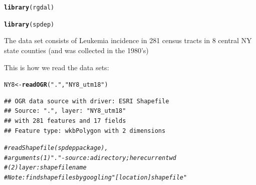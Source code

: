 \documentclass{article}\usepackage[]{graphicx}\usepackage[]{color}
\makeatletter
\newcommand{\hlstr}[1]{\textcolor[rgb]{0.192,0.494,0.8}{#1}}%
\newcommand{\hlcom}[1]{\textcolor[rgb]{0.678,0.584,0.686}{\textit{#1}}}%
\newcommand{\hlstd}[1]{\textcolor[rgb]{0.345,0.345,0.345}{#1}}%
\newcommand{\hlkwb}[1]{\textcolor[rgb]{0.69,0.353,0.396}{#1}}%
\newcommand{\hlkwd}[1]{\textcolor[rgb]{0.737,0.353,0.396}{\textbf{#1}}}%
\newenvironment{kframe}{%
 \def\at@end@of@kframe{}%
 \ifinner\ifhmode%
  \def\at@end@of@kframe{\end{minipage}}%
  \begin{minipage}{\columnwidth}%
 \fi\fi%
 \def\FrameCommand##1{\hskip\@totalleftmargin \hskip-\fboxsep
 \colorbox{shadecolor}{##1}\hskip-\fboxsep
     \hskip-\linewidth \hskip-\@totalleftmargin \hskip\columnwidth}%
 \MakeFramed {\advance\hsize-\width
   \@totalleftmargin\z@ \linewidth\hsize
   \@setminipage}}%
 {\par\unskip\endMakeFramed%
 \at@end@of@kframe}
\newenvironment{knitrout}{}{} %
\makeatother
\begin{document}
\begin{knitrout}
\color{fgcolor}\begin{kframe}
\begin{alltt}
\hlkwd{library}\hlstd{(rgdal)}
\end{alltt}


{\ttfamily\noindent\itshape\color{messagecolor}{\#\# Loading required package: sp\\\#\# rgdal: version: 0.8-16, (SVN revision 498)\\\#\# Geospatial Data Abstraction Library extensions to R successfully loaded\\\#\# Loaded GDAL runtime: GDAL 1.11.0, released 2014/04/16\\\#\# Path to GDAL shared files: C:/Users/Edgar/Documents/R/win-library/3.1/rgdal/gdal\\\#\# GDAL does not use iconv for recoding strings.\\\#\# Loaded PROJ.4 runtime: Rel. 4.8.0, 6 March 2012, [PJ\_VERSION: 480]\\\#\# Path to PROJ.4 shared files: C:/Users/Edgar/Documents/R/win-library/3.1/rgdal/proj}}\begin{alltt}
\hlkwd{library}\hlstd{(spdep)}
\end{alltt}


{\ttfamily\noindent\itshape\color{messagecolor}{\#\# Loading required package: Matrix}}\end{kframe}
\end{knitrout}

The data set consists of Leukemia incidence in 281 census tracts in 8 central NY state counties (and was collected in the 1980's)

This is how we read the data sets:
\begin{knitrout}
\color{fgcolor}\begin{kframe}
\begin{alltt}
\hlstd{NY8} \hlkwb{<-} \hlkwd{readOGR}\hlstd{(}\hlstr{"."}\hlstd{,} \hlstr{"NY8_utm18"}\hlstd{)}
\end{alltt}
\begin{verbatim}
## OGR data source with driver: ESRI Shapefile 
## Source: ".", layer: "NY8_utm18"
## with 281 features and 17 fields
## Feature type: wkbPolygon with 2 dimensions
\end{verbatim}
\begin{alltt}
\hlcom{# read Shapefile (spdep package), }
\hlcom{# arguments (1)"." - source: a directory; here current wd }
\hlcom{# (2) layer: shapefile name}
\hlcom{# Note: find shapefiles by googling "[location] shapefile"}
\end{alltt}
\end{kframe}
\end{knitrout}
\end{document}
